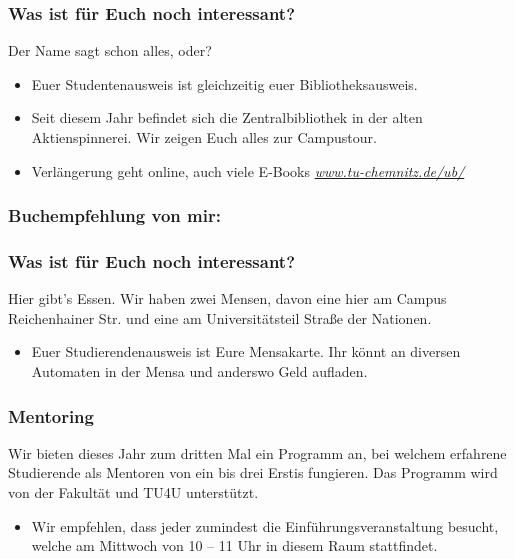 \documentclass[10pt]{beamer}
\begin{document}
\begin{frame}
	\frametitle{Was ist für Euch noch interessant?}

	\begin{block}{\vphantom{X}}
		Der Name sagt schon alles, oder?
	\end{block}

	\begin{itemize}
		\item Euer Studentenausweis ist gleichzeitig euer Bibliotheksausweis.
		\item Seit diesem Jahr befindet sich die Zentralbibliothek in der alten Aktienspinnerei. Wir zeigen Euch alles zur Campustour.
		\item Verlängerung geht online, auch viele E-Books \textit{\href{https://www.tu-chemnitz.de/ub/}{www.tu-chemnitz.de/ub/}}
	\end{itemize}
\end{frame}

\begin{frame}
	\frametitle{Buchempfehlung von mir:}
	
\end{frame}

\begin{frame}
	\frametitle{Was ist für Euch noch interessant?}

	\begin{block}{\vphantom{X}}
		Hier gibt's Essen. Wir haben zwei Mensen, davon eine hier am Campus Reichenhainer Str. und eine am Universitätsteil Straße der Nationen.
	\end{block}

	\begin{itemize}
		\item Euer Studierendenausweis ist Eure Mensakarte. Ihr könnt an diversen Automaten in der Mensa und anderswo Geld aufladen.
	\end{itemize}
\end{frame}

\begin{frame}
	\frametitle{Mentoring}

	\begin{block}{\vphantom{X}}
		Wir bieten dieses Jahr zum dritten Mal ein Programm an, bei welchem erfahrene Studierende als Mentoren von ein bis drei Erstis fungieren. Das Programm wird von der Fakultät und TU4U unterstützt.
	\end{block}
	
	\begin{itemize}
		\item Wir empfehlen, dass jeder zumindest die Einführungsveranstaltung besucht, welche am Mittwoch von 10 -- 11 Uhr in diesem Raum stattfindet.
	\end{itemize}
\end{frame}
\end{document}
